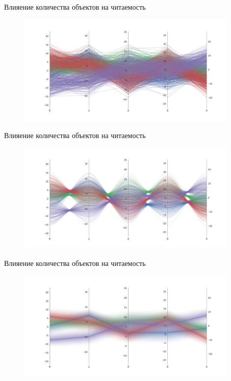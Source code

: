 \documentclass[fleqn, xcolor=x11names]{beamer}
\begin{document}
\begin{frame}{Влияение количества объектов на читаемость}
    \begin{figure}[htb]
        \centering
        \includegraphics[width=10.5cm]{base_bad_clustering.pdf}
    \end{figure}
\end{frame}

\begin{frame}{Влияение количества объектов на читаемость}
    \begin{figure}[htb]
        \centering
        \includegraphics[width=10.5cm]{bad_clustering.pdf}
    \end{figure}
\end{frame}

\begin{frame}{Влияение количества объектов на читаемость}
    \begin{figure}[htb]
        \centering
        \includegraphics[width=10.5cm]{bad_hierarchical_clustering.pdf}
    \end{figure}
\end{frame}
\end{document}

